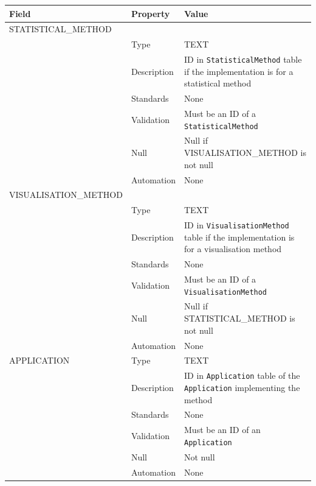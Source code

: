 \documentclass[
]{article}
\newcounter{none}
\begin{document}
{\def\LTcaptype{none} 
\begin{longtable}[]{@{}
  >{\raggedright\arraybackslash}p{}
  >{\raggedright\arraybackslash}p{}
  >{\raggedright\arraybackslash}p{}@{}}
\toprule\noalign{}
\begin{minipage}[b]{\linewidth}\raggedright
Field
\end{minipage} & \begin{minipage}[b]{\linewidth}\raggedright
Property
\end{minipage} & \begin{minipage}[b]{\linewidth}\raggedright
Value
\end{minipage} \\
\midrule\noalign{}
\endhead
\bottomrule\noalign{}
\endlastfoot
STATISTICAL\_METHOD & & \\
& Type & TEXT \\
& Description & ID in \texttt{StatisticalMethod} table if the
implementation is for a statistical method \\
& Standards & None \\
& Validation & Must be an ID of a \texttt{StatisticalMethod} \\
& Null & Null if VISUALISATION\_METHOD is not null \\
& Automation & None \\
VISUALISATION\_METHOD & & \\
& Type & TEXT \\
& Description & ID in \texttt{VisualisationMethod} table if the
implementation is for a visualisation method \\
& Standards & None \\
& Validation & Must be an ID of a \texttt{VisualisationMethod} \\
& Null & Null if STATISTICAL\_METHOD is not null \\
& Automation & None \\
APPLICATION & Type & TEXT \\
& Description & ID in \texttt{Application} table of the
\texttt{Application} implementing the method \\
& Standards & None \\
& Validation & Must be an ID of an \texttt{Application} \\
& Null & Not null \\
& Automation & None \\
\end{longtable}
}
\end{document}
